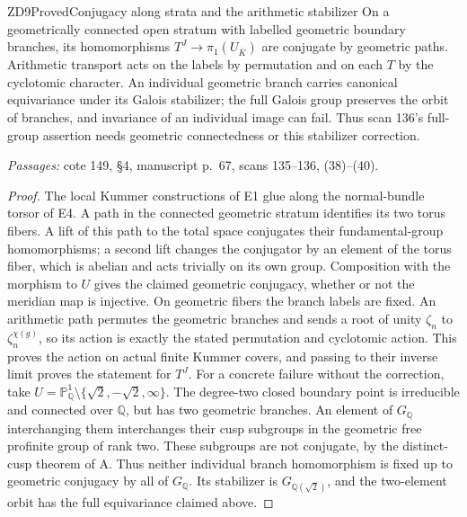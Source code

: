 \begin{result}{ZD9}{Proved}{Conjugacy along strata and the arithmetic stabilizer}
On a geometrically connected open stratum with labelled geometric boundary branches, its homomorphisms $T^J\to\pi_1(U_{\overline K})$ are conjugate by geometric paths. Arithmetic transport acts on the labels by permutation and on each $T$ by the cyclotomic character. An individual geometric branch carries canonical equivariance under its Galois stabilizer; the full Galois group preserves the orbit of branches, and invariance of an individual image can fail. Thus scan 136's full-group assertion needs geometric connectedness or this stabilizer correction.
\par\emph{Passages:} cote 149, \S4, manuscript p.~67, scans 135--136, (38)--(40).
\end{result}
\begin{proof}
The local Kummer constructions of E1 glue along the normal-bundle torsor of E4. A path in the connected geometric stratum identifies its two torus fibers. A lift of this path to the total space conjugates their fundamental-group homomorphisms; a second lift changes the conjugator by an element of the torus fiber, which is abelian and acts trivially on its own group. Composition with the morphism to $U$ gives the claimed geometric conjugacy, whether or not the meridian map is injective. On geometric fibers the branch labels are fixed. An arithmetic path permutes the geometric branches and sends a root of unity $\zeta_n$ to $\zeta_n^{\chi(g)}$, so its action is exactly the stated permutation and cyclotomic action. This proves the action on actual finite Kummer covers, and passing to their inverse limit proves the statement for $T^J$.
For a concrete failure without the correction, take $U=\mathbb P^1_{\mathbb Q}\setminus\{\sqrt2,-\sqrt2,\infty\}$. The degree-two closed boundary point is irreducible and connected over $\mathbb Q$, but has two geometric branches. An element of $G_{\mathbb Q}$ interchanging them interchanges their cusp subgroups in the geometric free profinite group of rank two. These subgroups are not conjugate, by the distinct-cusp theorem of A. Thus neither individual branch homomorphism is fixed up to geometric conjugacy by all of $G_{\mathbb Q}$. Its stabilizer is $G_{\mathbb Q(\sqrt2)}$, and the two-element orbit has the full equivariance claimed above.
\end{proof}

